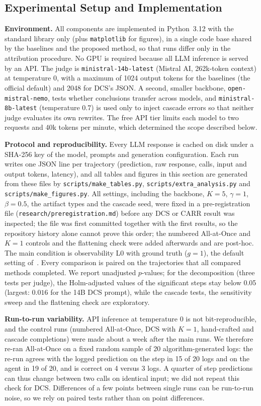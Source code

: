 \documentclass[conference]{IEEEtran}
\begin{document}
\subsection{Experimental Setup and Implementation}\label{sec:setup}
\textbf{Environment.} All components are implemented in Python~3.12 with the standard library only (plus \texttt{matplotlib} for figures), in a single code base shared by the baselines and the proposed method, so that runs differ only in the attribution procedure. No GPU is required because all LLM inference is served by an API. The judge is \texttt{ministral-14b-latest} (Mistral AI, 262k-token context) at temperature 0, with a maximum of 1024 output tokens for the baselines (the official default) and 2048 for DCS's JSON. A second, smaller backbone, \texttt{open-mistral-nemo}, tests whether conclusions transfer across models, and \texttt{ministral-8b-latest} (temperature 0.7) is used only to inject cascade errors so that neither judge evaluates its own rewrites. The free API tier limits each model to two requests and 40k tokens per minute, which determined the scope described below.

\textbf{Protocol and reproducibility.} Every LLM response is cached on disk under a SHA-256 key of the model, prompts and generation configuration. Each run writes one JSON line per trajectory (prediction, raw response, calls, input and output tokens, latency), and all tables and figures in this section are generated from these files by \texttt{scripts/make\_tables.py}, \texttt{scripts/extra\_analysis.py} and \texttt{scripts/make\_figures.py}. All settings, including the backbone, $K=5$, $\gamma=1$, $\beta=0.5$, the artifact types and the cascade seed, were fixed in a pre-registration file (\texttt{research/preregistration.md}) before any DCS or CARR result was inspected; the file was first committed together with the first results, so the repository history alone cannot prove this order; the numbered All-at-Once and $K{=}1$ controls and the flattening check were added afterwards and are post-hoc. The main condition is observability L0 with ground truth ($g=1$), the default setting of~\cite{zhang2025whowhen}. Every comparison is paired on the trajectories that all compared methods completed. We report unadjusted $p$-values; for the decomposition (three tests per judge), the Holm-adjusted values of the significant steps stay below 0.05 (largest: $0.016$ for the 14B DCS prompt), while the cascade tests, the sensitivity sweep and the flattening check are exploratory.

\textbf{Run-to-run variability.} API inference at temperature 0 is not bit-reproducible, and the control runs (numbered All-at-Once, DCS with $K{=}1$, hand-crafted and cascade completions) were made about a week after the main runs. We therefore re-ran All-at-Once on a fixed random sample of 20 algorithm-generated logs: the re-run agrees with the logged prediction on the step in 15 of 20 logs and on the agent in 19 of 20, and is correct on 4 versus 3 logs. A quarter of step predictions can thus change between two calls on identical input; we did not repeat this check for DCS. Differences of a few points between single runs can be run-to-run noise, so we rely on paired tests rather than on point differences.
\end{document}
